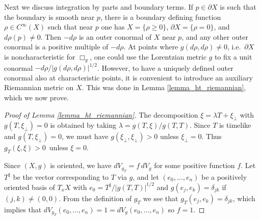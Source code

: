 \documentclass[11pt,letterpaper]{amsart}
\theoremstyle{definition}
\numberwithin{equation}{section}
\newcommand{\p}{\partial}
\def\p{\partial}
\begin{document}
Next we discuss integration by parts and boundary terms. If $p \in \p X$ is such that the boundary is smooth near $p$, there is a boundary defining function $\rho \in C^{\infty}(X)$ such that near $p$ one has $X = \{ \rho \geq 0 \}$, $\p X = \{ \rho = 0 \}$, and $d\rho(p) \neq 0$. Then $-d\rho$ is an outer conormal of $X$ near $p$, and any other outer conormal is a positive multiple of $-d\rho$. At points where $g(d\rho, d\rho) \neq 0$, i.e.\ $\p X$ is noncharacteristic for $\Box_g$, one could use the Lorentzian metric $g$ to fix a unit conormal $-d\rho/|g(d\rho, d\rho)|^{1/2}$. However, to have a uniquely defined outer conormal also at characteristic points, it is convenient to introduce an auxiliary Riemannian metric on $X$. This was done in Lemma \ref{lemma_ht_riemannian}, which we now prove.

\begin{proof}[Proof of Lemma \ref{lemma_ht_riemannian}]
The decomposition $\xi = \lambda T + \xi_{\perp}$ with $g(T, \xi_{\perp}) = 0$ is obtained by taking $\lambda = g(T,\xi)/g(T,T)$. Since $T$ is timelike and $g(T, \xi_{\perp}) = 0$, we must have $g(\xi_{\perp}, \xi_{\perp}) > 0$ unless $\xi_{\perp} = 0$. Thus $g_T(\xi, \xi) > 0$ unless $\xi = 0$.

Since $(X,g)$ is oriented, we have $dV_{g_T} = f \,dV_g$ for some positive function $f$. Let $T^{\sharp}$ be the vector corresponding to $T$ via $g$, and let $(e_0, \ldots, e_n)$ be a positively oriented basis of $T_x X$ with $e_0 = T^{\sharp}/|g(T,T)|^{1/2}$ and $g(e_j, e_k) = \delta_{jk}$ if $(j, k) \neq (0, 0)$. From the definition of $g_T$ we see that $g_T(e_j, e_k) = \delta_{jk}$, which implies that $dV_{g_T}(e_0, \ldots, e_n) = 1 = dV_g(e_0, \ldots, e_n)$ so $f = 1$.
\end{proof}
\end{document}
